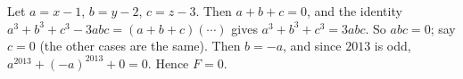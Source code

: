 Let $a=x-1$, $b=y-2$, $c=z-3$. Then $a+b+c=0$, and the identity $a^3+b^3+c^3-3abc=(a+b+c)(\cdots)$ gives $a^3+b^3+c^3=3abc$. So $abc=0$; say $c=0$ (the other cases are the same). Then $b=-a$, and since $2013$ is odd, $a^{2013}+(-a)^{2013}+0=0$. Hence $F=\boxed{0}$.
